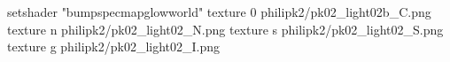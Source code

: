 setshader "bumpspecmapglowworld"
texture 0 philipk2/pk02_light02b_C.png
texture n philipk2/pk02_light02_N.png
texture s philipk2/pk02_light02_S.png
texture g philipk2/pk02_light02_I.png

